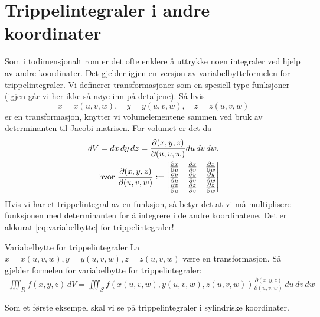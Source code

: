 \section{Trippelintegraler i andre koordinater}\label{sect:trippelint_andre}
Som i todimensjonalt rom er det ofte enklere å uttrykke noen integraler ved hjelp av andre koordinater. Det gjelder igjen en versjon av variabelbytteformelen  for trippelintegraler. Vi definerer transformasjoner som en spesiell type funksjoner (igjen går vi her ikke så nøye inn på detaljene). Så hvis \[x=x(u,v,w), \quad y=y(u,v,w), \quad z=z(u,v,w)\]
er en transformasjon, knytter vi volumelementene sammen ved bruk av determinanten til Jacobi-matrisen. For volumet er det da
\begin{align}\label{eq:volum_variablebytte}
dV = dx\, dy\, dz = \frac{\partial (x,y,z)}{\partial (u,v,w)} du\, dv\, dw. \\ 
\text{hvor } \frac{\partial(x,y,z)}{\partial(u,v,w)}:= \begin{vmatrix} \frac{\partial x}{\partial u} & \frac{\partial x}{\partial v} & \frac{\partial x}{\partial w} \\ \frac{\partial y}{\partial u} & \frac{\partial y}{\partial v} & \frac{\partial y}{\partial w} \\ \frac{\partial z}{\partial u} & \frac{\partial z}{\partial v} & \frac{\partial z}{\partial w}\end{vmatrix}\notag\end{align}
Hvis vi har et trippelintegral av en funksjon, så betyr det at vi må multiplisere funksjonen med determinanten for å integrere i de andre koordinatene. Det er akkurat \eqref{eq:variabelbytte} for trippelintegraler!
\begin{oppsum}{Variabelbytte for trippelintegraler}
La $x=x(u,v,w),y=y(u,v,w), z=z(u,v,w)$ være en transformasjon. Så gjelder formelen for variabelbytte for trippelintegraler:
\begin{align*}
\iiint_R f(x, y,z)\, dV = \iiint_S f(x(u, v,w), y(u, v,w), z(u,v,w))\frac{\partial(x, y,z)}{\partial(u, v,w)}\, du\, dv\, dw
\end{align*}
\end{oppsum}
Som et første eksempel skal vi se på trippelintegraler i sylindriske koordinater. 
